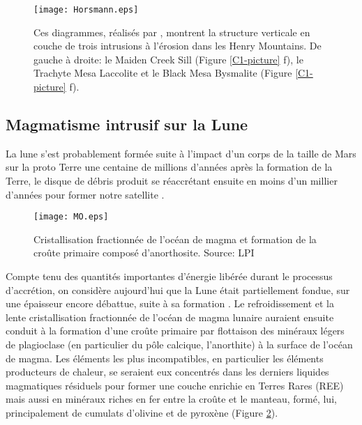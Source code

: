 \begin{figure}[htpb]
  \begin{center}
    \graphicspath{ {/Users/thorey/Documents/These/Manuscript/Figure/Chapter1/} }
    \texttt{[image: Horsmann.eps]}
    \caption{Ces  diagrammes,  réalisés  par  \citet{Horsman:2009gea},
      montrent la structure verticale en  couche de trois intrusions à
      l'érosion  dans les  Henry  Mountains. De  gauche  à droite:  le
      Maiden Creek Sill (Figure  \ref{C1-picture} f), le Trachyte Mesa
      Laccolite et  le Black  Mesa Bysmalite  (Figure \ref{C1-picture}
      f).}
    \label{C1-Horsmann}
  \end{center}
\end{figure}

\subsection{Magmatisme intrusif sur la Lune}
\label{C1-sec:moon}

La lune  s'est probablement formée suite  à l'impact d'un corps  de la
taille de  Mars sur la proto  Terre une centaine de  millions d'années
après  la formation  de  la  Terre, le  disque  de  débris produit  se
réaccrétant ensuite en  moins d'un millier d'années  pour former notre
satellite
\citep{Mizutani:1972hc,Cameron:1991vu,Canup:2001eb,Canup:2012cd}.
\begin{figure}[h!]
  \begin{center}
    \graphicspath{ {/Users/thorey/Documents/These/Manuscript/Figure/Chapter1/} }
    \texttt{[image: MO.eps]}
    \caption{Cristallisation  fractionnée  de   l'océan  de  magma  et
      formation de  la croûte primaire composé  d'anorthosite. Source:
      LPI}
    \label{C1-MO}
  \end{center}
\end{figure}
Compte  tenu des  quantités  importantes d'énergie  libérée durant  le
processus  d'accrétion, on  considère  aujourd'hui que  la Lune  était
partiellement fondue,  sur une épaisseur  encore débattue, suite  à sa
formation \citep{ElkinsTanton:2011ce}.  Le refroidissement et la lente
cristallisation  fractionnée  de  l'océan de  magma  lunaire  auraient
ensuite conduit  à la formation  d'une croûte primaire  par flottaison
des minéraux légers  de plagioclase (en particulier  du pôle calcique,
l'anorthite) à la  surface de l'océan de magma. Les  éléments les plus
incompatibles, en particulier les  éléments producteurs de chaleur, se
seraient  eux  concentrés  dans   les  derniers  liquides  magmatiques
résiduels pour former  une couche enrichie en Terres  Rares (REE) mais
aussi en minéraux riches en fer  entre la croûte et le manteau, formé,
lui,  principalement  de cumulats  d'olivine  et  de pyroxène  (Figure
\ref{C1-MO}).

